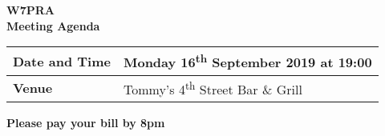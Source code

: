 \documentclass[letter,11pt]{extarticle}
\begin{document}
	\thispagestyle{empty}
	
	\begin{center}
		\textbf{W7PRA\\Meeting Agenda}
		\vspace{0.33cm}
	\end{center}
	
	\begin{center}
		\begin{tabular}{| m{3.0cm} | m{7.5cm} |} \hline
			\textbf{Date and Time} & Monday 16\textsuperscript{th} September 2019 at 19:00 \\ \hline
			\textbf{Venue} & Tommy's 4\textsuperscript{th} Street Bar \& Grill \\ \hline
				\end{tabular}
	\end{center}
	
	\begin{center}
		\textbf{Please pay your bill by 8pm}
	\end{center}
	
\end{document}
